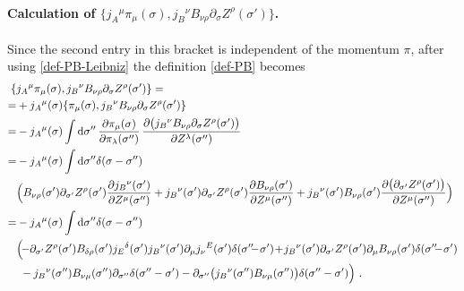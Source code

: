 \documentclass[12pt]{article}
\numberwithin{equation}{section}
\begin{document}
\paragraph{Calculation of $\{ j_{A}{}^{\mu}\pi_{\mu}(\sigma),j_{B}{}^{\nu}B_{\nu\rho}\partial_{\sigma}Z^{\rho}(\sigma') \}$.} Since the second entry in this bracket is independent of the momentum $\pi$, after using \eqref{def-PB-Leibniz} the definition \eqref{def-PB} becomes
\begin{align}
\{ &j_{A}{}^{\mu}\pi_{\mu}(\sigma),j_{B}{}^{\nu}B_{\nu\rho}\partial_{\sigma}Z^{\rho}(\sigma') \} =
\notag \\
=&+j_{A}{}^{\mu}(\sigma)\{ \pi_{\mu}(\sigma),j_{B}{}^{\nu}B_{\nu\rho}\partial_{\sigma}Z^{\rho}(\sigma') \}
\notag \\
=&-j_{A}{}^{\mu}(\sigma) \int \mathrm{d}\sigma'' \, \frac{\partial \pi_{\mu}(\sigma)}{\partial \pi_{\lambda}(\sigma'')} \, \frac{\partial\bigl(j_{B}{}^{\nu}B_{\nu\rho}\partial_{\sigma}Z^{\rho}(\sigma')\bigr)}{\partial Z^{\lambda}(\sigma'')}
\notag \\
=&-j_{A}{}^{\mu}(\sigma)\int \mathrm{d}\sigma'' \delta(\sigma-\sigma'') 
\notag \\
& \Bigl( B_{\nu\rho}(\sigma')\partial_{\sigma'}Z^{\rho}(\sigma')\frac{\partial j_{B}{}^{\nu}(\sigma')}{\partial Z^{\mu}(\sigma'')} +j_{B}{}^{\nu}(\sigma')\partial_{\sigma'}Z^{\rho}(\sigma')\frac{\partial B_{\nu\rho}(\sigma')}{\partial Z^{\mu}(\sigma'')}+j_{B}{}^{\nu}(\sigma')B_{\nu\rho}(\sigma')\frac{\partial \bigl(\partial_{\sigma'}Z^{\rho}(\sigma')\bigr)}{\partial Z^{\mu}(\sigma'')}\Bigr)
\notag \\
=&-j_{A}{}^{\mu}(\sigma)\int \mathrm{d}\sigma'' \delta(\sigma-\sigma'') 
\notag \\
& \Bigl(\!-\partial_{\sigma'}Z^{\rho}(\sigma')B_{\delta\rho}(\sigma')j_{E}{}^{\delta}(\sigma')j_{B}{}^{\nu}(\sigma')\partial_{\mu}j_{\nu}{}^{E}(\sigma')\delta(\sigma''\!\!\!-\!\sigma')\!+\!j_{B}{}^{\nu}(\sigma')\partial_{\sigma'}Z^{\rho}(\sigma')\partial_{\mu}B_{\nu\rho}(\sigma')\delta(\sigma''\!\!\!-\!\sigma') 
\notag \\
& \,\, - j_{B}{}^{\nu}(\sigma'')B_{\nu\mu}(\sigma'')\partial_{\sigma''}\delta(\sigma''-\sigma')-\partial_{\sigma''}\bigl(j_{B}{}^{\nu}(\sigma'')B_{\nu\mu}(\sigma'')\bigr)\delta(\sigma''-\sigma')\Bigr) \,\, .
\end{align}
\end{document}
